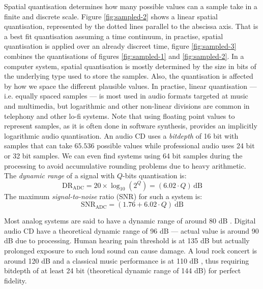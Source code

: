 Spatial quantisation determines how many
possible values can a sample take in a finite and discrete
scale. Figure \ref{fig:sampled-2} shows a linear spatial quantisation,
represented by the dotted lines parallel to the abscissa axis. That is
a best fit quantisation assuming a time continuum, in practise,
spatial quantisation is applied over an already discreet time, figure
\ref{fig:sampled-3} combines the quantisations of figures
\ref{fig:sampled-1} and \ref{fig:sampled-2}. In a computer system,
spatial quantisation is mostly determined by the size in bits of the
underlying type used to store the samples. Also, the quantisation is
affected by how we space the different plausible values. In practise,
linear quantisation --- i.e. equally spaced samples --- is most used
in audio formats targeted at music and multimedia, but logarithmic and
other non-linear divisions are common in telephony and other lo-fi
systems. Note that using floating point values to represent samples,
as it is often done in software synthesis, provides an implicitly
logarithmic audio quantisation. An audio CD uses a
\emph{bitdepth} of 16 bit with samples that can take
$65.536$ possible values while professional audio uses 24 bit or 32
bit samples. We can even find systems using 64 bit samples during the
processing to avoid accumulative rounding problems due to heavy
arithmetic. The \emph{dynamic range} of a signal
with $Q$-bits quantisation is:
\begin{equation}
  \mathrm{DR_{ADC}} = 20 \times \log_{10}(2^Q) = (6.02 \cdot Q)\, \mathrm{dB}
\end{equation}
 The maximum \emph{signal-to-noise}
ratio (SNR) for such a system is:
\begin{equation}
  \mathrm{SNR_{ADC}} =  \left (1.76 + 6.02 \cdot Q \right )\ \mathrm{dB}
\end{equation}

Most analog systems are said to have a dynamic range of around 80 dB
\cite{fries05digital}. Digital audio CD have a theoretical dynamic
range of 96 dB --- actual value is around 90 dB due to
processing. Human hearing pain threshold is at 135 dB but actually
prolonged exposure to such loud sound can cause damage. A loud rock
concert is around 120 dB and a classical music performance is at 110
dB \cite{ludwig09music}, thus requiring bitdepth of at least 24 bit
(theoretical dynamic range of 144 dB) for perfect fidelity.

